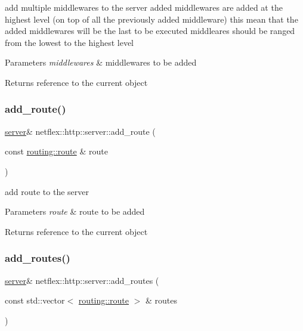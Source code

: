 add multiple middlewares to the server added middlewares are added at the highest level (on top of all the previously added middleware) this mean that the added middlewares will be the last to be executed middleares should be ranged from the lowest to the highest level


\begin{DoxyParams}{Parameters}
{\em middlewares} & middlewares to be added \\
\hline
\end{DoxyParams}
\begin{DoxyReturn}{Returns}
reference to the current object 
\end{DoxyReturn}
\mbox{\label{classnetflex_1_1http_1_1server_a704f899f913b798d217bf75309043add}} 
\subsubsection{\texorpdfstring{add\+\_\+route()}{add\_route()}}
{\footnotesize\ttfamily \hyperlink{classnetflex_1_1http_1_1server}{server}\& netflex\+::http\+::server\+::add\+\_\+route (\begin{DoxyParamCaption}\item[{const \hyperlink{classnetflex_1_1routing_1_1route}{routing\+::route} \&}]{route }\end{DoxyParamCaption})}

add route to the server


\begin{DoxyParams}{Parameters}
{\em route} & route to be added \\
\hline
\end{DoxyParams}
\begin{DoxyReturn}{Returns}
reference to the current object 
\end{DoxyReturn}
\mbox{\label{classnetflex_1_1http_1_1server_a1363b27c4d5752706239407dc961d8d5}} 
\subsubsection{\texorpdfstring{add\+\_\+routes()}{add\_routes()}}
{\footnotesize\ttfamily \hyperlink{classnetflex_1_1http_1_1server}{server}\& netflex\+::http\+::server\+::add\+\_\+routes (\begin{DoxyParamCaption}\item[{const std\+::vector$<$ \hyperlink{classnetflex_1_1routing_1_1route}{routing\+::route} $>$ \&}]{routes }\end{DoxyParamCaption})}


